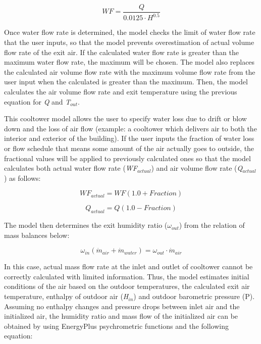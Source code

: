 \begin{equation}
WF = \frac{Q}{{0.0125 \cdot {H^{0.5}}}}
\end{equation}

Once water flow rate is determined, the model checks the limit of water flow rate that the user inputs, so that the model prevents overestimation of actual volume flow rate of the exit air. If the calculated water flow rate is greater than the maximum water flow rate, the maximum will be chosen. The model also replaces the calculated air volume flow rate with the maximum volume flow rate from the user input when the calculated is greater than the maximum. Then, the model calculates the air volume flow rate and exit temperature using the previous equation for \emph{Q} and \emph{T\(_{out}\)}.

This cooltower model allows the user to specify water loss due to drift or blow down and the loss of air flow (example: a cooltower which delivers air to both the interior and exterior of the building). If the user inputs the fraction of water loss or flow schedule that means some amount of the air actually goes to outside, the fractional values will be applied to previously calculated ones so that the model calculates both actual water flow rate (\emph{WF\(_{actual}\)}) and air volume flow rate (\emph{Q\(_{actual}\)}) as follows:

\begin{equation}
W{F_{actual}} = WF(1.0 + Fraction)
\end{equation}

\begin{equation}
{Q_{actual}} = Q(1.0 - Fraction)
\end{equation}

The model then determines the exit humidity ratio (\({\omega_{out}}\)) from the relation of mass balances below:

\begin{equation}
{\omega_{in}}({\dot m_{air}} + {\dot m_{water}}) = {\omega_{out}} \cdot {\dot m_{air}}
\end{equation}

In this case, actual mass flow rate at the inlet and outlet of cooltower cannot be correctly calculated with limited information. Thus, the model estimates initial conditions of the air based on the outdoor temperatures, the calculated exit air temperature, enthalpy of outdoor air (\emph{H\(_{in}\)}) and outdoor barometric pressure (P). Assuming no enthalpy changes and pressure drops between inlet air and the initialized air, the humidity ratio and mass flow of the initialized air can be obtained by using EnergyPlus psychrometric functions and the following equation:

